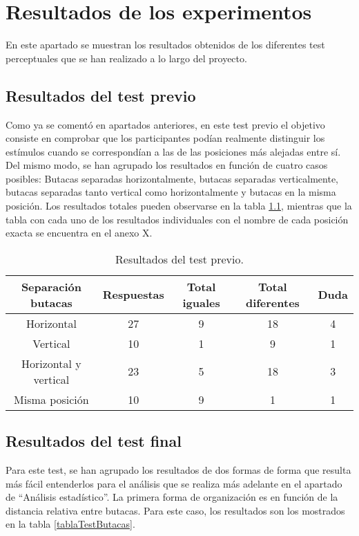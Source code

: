 \documentclass[11pt,a4paper,twoside]{book}
\author{Víctor de Tejada Molera}
\begin{document}
\chapter{Resultados de los experimentos}
    En este apartado se muestran los resultados obtenidos de los diferentes test perceptuales que se han realizado a lo largo del proyecto. 
    \section{Resultados del test previo}
        Como ya se comentó en apartados anteriores, en este test previo el objetivo consiste en comprobar que los participantes podían realmente distinguir los estímulos cuando se correspondían a las de las posiciones más alejadas entre sí. Del mismo modo, se han agrupado los resultados en función de cuatro casos posibles: Butacas separadas horizontalmente, butacas separadas verticalmente, butacas separadas tanto vertical como horizontalmente y butacas en la misma posición. Los resultados totales pueden observarse en la tabla \ref{tablaTestPrevio}, mientras que la tabla con cada uno de los resultados individuales con el nombre de cada posición exacta se encuentra en el anexo X.
        
        \begin{table}[H]
			\begin{center}
			\begin{scriptsize}
			\begin{tabular}{| c | c | c | c | c |}
			    \hline
				\textbf{Separación butacas}&\textbf{Respuestas}&\textbf{Total iguales}&\textbf{Total diferentes}&\textbf{Duda}\\ \hline
                Horizontal&27&9&18&4\\ \hline
                Vertical&10&1&9&1\\ \hline
                Horizontal y vertical&23&5&18&3\\ \hline
                Misma posición&10&9&1&1\\ \hline
			\end{tabular}
			\caption{Resultados del test previo.}
			\label{tablaTestPrevio}
			\end{scriptsize}
			\end{center}	
		\end{table}	
	\section{Resultados del test final}
	    Para este test, se han agrupado los resultados de dos formas de forma que resulta más fácil entenderlos para el análisis que se realiza más adelante en el apartado de ``Análisis estadístico''. La primera forma de organización es en función de la distancia relativa entre butacas. Para este caso, los resultados son los mostrados en la tabla \ref{tablaTestButacas}.
	    
\end{document}
